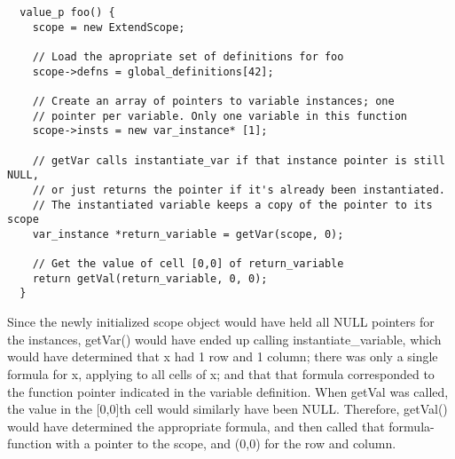 \begin{lstlisting}
  value_p foo() {
    scope = new ExtendScope;

    // Load the apropriate set of definitions for foo
    scope->defns = global_definitions[42];

    // Create an array of pointers to variable instances; one
    // pointer per variable. Only one variable in this function
    scope->insts = new var_instance* [1];

    // getVar calls instantiate_var if that instance pointer is still NULL,
    // or just returns the pointer if it's already been instantiated.
    // The instantiated variable keeps a copy of the pointer to its scope
    var_instance *return_variable = getVar(scope, 0);

    // Get the value of cell [0,0] of return_variable
    return getVal(return_variable, 0, 0);
  }
\end{lstlisting}
\medskip \noindent

Since the newly initialized scope object would have held all NULL pointers for the instances, getVar() would have ended up calling instantiate_variable, which would have determined that x had 1 row and 1 column; there was only a single formula for x, applying to all cells of x; and that that formula corresponded to the function pointer indicated in the variable definition.
When getVal was called, the value in the [0,0]th cell would similarly have been NULL. Therefore, getVal() would have determined the appropriate formula, and then called that formula-function with a pointer to the scope, and (0,0) for the row and column.
